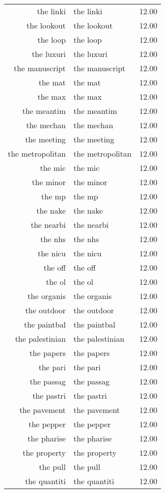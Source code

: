 \begin{table}[ht]
\begin{tabular}{rlr}
  the linki & the linki & 12.00 \\ 
  the lookout & the lookout & 12.00 \\ 
  the loop & the loop & 12.00 \\ 
  the luxuri & the luxuri & 12.00 \\ 
  the manuscript & the manuscript & 12.00 \\ 
  the mat & the mat & 12.00 \\ 
  the max & the max & 12.00 \\ 
  the meantim & the meantim & 12.00 \\ 
  the mechan & the mechan & 12.00 \\ 
  the meeting & the meeting & 12.00 \\ 
  the metropolitan & the metropolitan & 12.00 \\ 
  the mic & the mic & 12.00 \\ 
  the minor & the minor & 12.00 \\ 
  the mp & the mp & 12.00 \\ 
  the nake & the nake & 12.00 \\ 
  the nearbi & the nearbi & 12.00 \\ 
  the nhs & the nhs & 12.00 \\ 
  the nicu & the nicu & 12.00 \\ 
  the off & the off & 12.00 \\ 
  the ol & the ol & 12.00 \\ 
  the organis & the organis & 12.00 \\ 
  the outdoor & the outdoor & 12.00 \\ 
  the paintbal & the paintbal & 12.00 \\ 
  the palestinian & the palestinian & 12.00 \\ 
  the papers & the papers & 12.00 \\ 
  the pari & the pari & 12.00 \\ 
  the passag & the passag & 12.00 \\ 
  the pastri & the pastri & 12.00 \\ 
  the pavement & the pavement & 12.00 \\ 
  the pepper & the pepper & 12.00 \\ 
  the pharise & the pharise & 12.00 \\ 
  the property & the property & 12.00 \\ 
  the pull & the pull & 12.00 \\ 
  the quantiti & the quantiti & 12.00 \\ 

\end{tabular}
\end{table}

